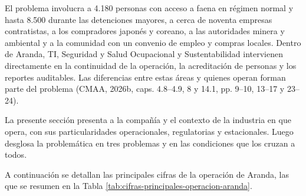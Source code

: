 \documentclass[subdoc]{../../comun/overfore}
\begin{document}
El problema involucra a 4.180 personas con acceso a faena en régimen normal y hasta 8.500 durante las detenciones mayores, a cerca de noventa empresas contratistas, a los compradores japonés y coreano, a las autoridades minera y ambiental y a la comunidad con un convenio de empleo y compras locales. Dentro de Aranda, TI, Seguridad y Salud Ocupacional y Sustentabilidad intervienen directamente en la continuidad de la operación, la acreditación de personas y los reportes auditables. Las diferencias entre estas áreas y quienes operan forman parte del problema (CMAA, 2026b, caps. 4.8–4.9, 8 y 14.1, pp. 9–10, 13–17 y 23–24).

La presente sección presenta a la compañía y el contexto de la industria en que opera, con sus particularidades operacionales, regulatorias y estacionales. Luego desglosa la problemática en tres problemas y en las condiciones que los cruzan a todos.

A continuación se detallan las principales cifras de la operación de Aranda, las que se resumen en la Tabla \ref{tab:cifras-principales-operacion-aranda}.
\end{document}
